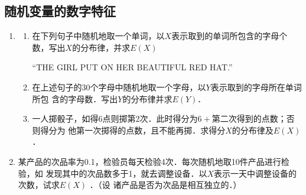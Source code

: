 \subsection{随机变量的数字特征}
\begin{enumerate}

    


    





    \item \begin{enumerate}
        \item 在下列句子中随机地取一个单词，以$X$表示取到的单词所包含的字母个数，写出$X$的分布律，并求$E(X)$
        \begin{center}
            “THE GIRL PUT ON HER BEAUTIFUL RED HAT.”
        \end{center}
        \item 在上述句子的30个字母中随机地取一个字母，以$Y$表示取到的字母所在单词所包
        含的字母数．写出$Y$的分布律并求$E(Y)$．
        \item 一人掷骰子，如得6点则掷第2次．此时得分为$6+\mbox{第二次得到的点数}$；否则得分为
        他第一次掷得的点数，且不能再掷．求得分$X$的分布律及$E(X)$．
    \end{enumerate}


    \item 某产品的次品率为0.1，检验员每天检验4次．每次随机地取10件产品进行检验，如
    发现其中的次品数多于1，就去调整设备．以$X$表示一天中调整设备的次数，试求$E(X)$ ．（设
    诸产品是否为次品是相互独立的．）




\end{enumerate}
